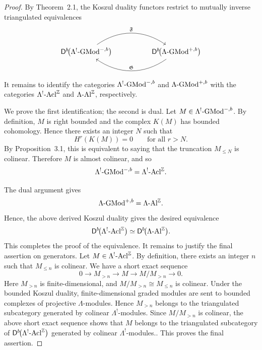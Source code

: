 \documentclass[11pt]{article}
\theoremstyle{definition}
\theoremstyle{remark}
\begin{document}
\begin{proof}
By Theorem~2.1, the Koszul duality functors restrict to mutually inverse
triangulated equivalences
\[
\begin{tikzcd}[column sep=huge]
\mathsf{D}^{b}\!\bigl(\Lambda^{!}\textup{-}\mathrm{GMod}^{-,b}\bigr)
\arrow[r, bend left=35, "\mathfrak{F}"]
&
\mathsf{D}^{b}\!\bigl(\Lambda\textup{-}\mathrm{GMod}^{+,b}\bigr)
\arrow[l, bend left=35, "\mathfrak{G}"']
\end{tikzcd}
\]
It remains to identify the categories
\(\Lambda^{!}\textup{-}\mathrm{GMod}^{-,b}\) and
\(\Lambda\textup{-}\mathrm{GMod}^{+,b}\) with the categories
\(\Lambda^{!}\textup{-Acl}^{\mathbb Z}\) and
\(\Lambda\textup{-Al}^{\mathbb Z}\), respectively.

We prove the first identification; the second is dual. Let
\(M\in\Lambda^{!}\textup{-}\mathrm{GMod}^{-,b}\). By definition,
\(M\) is right bounded and the complex \(K(M)\) has bounded cohomology.
Hence there exists an integer \(N\) such that
\[
H^r(K(M))=0
\qquad
\text{for all } r>N.
\]
By Proposition~3.1, this is equivalent to saying that the truncation
\(M_{\leq N}\) is colinear. Therefore \(M\) is almost colinear, and so
\[
\Lambda^{!}\textup{-}\mathrm{GMod}^{-,b}
=
\Lambda^{!}\textup{-Acl}^{\mathbb Z}.
\]

The dual argument gives
\[
\Lambda\textup{-}\mathrm{GMod}^{+,b}
=
\Lambda\textup{-Al}^{\mathbb Z}.
\]
Hence, the above derived Koszul duality gives
the desired equivalence
\[
\mathsf{D}^{b}\!\bigl(\Lambda^{!}\textup{-Acl}^{\mathbb Z}\bigr)
\simeq
\mathsf{D}^{b}\!\bigl(\Lambda\textup{-Al}^{\mathbb Z}\bigr).
\]
This completes the proof of the equivalence. It remains to justify the final assertion on generators. Let
\(M\in \Lambda^{!}\textup{-}\mathrm{Acl}^{\mathbb{Z}}\). By definition, there
exists an integer \(n\) such that \(M_{\leq n}\) is colinear. We have a short
exact sequence
\[
0
\longrightarrow
M_{>n}
\longrightarrow
M
\longrightarrow
M/M_{>n}
\longrightarrow
0 .
\]
Here \(M_{>n}\) is finite-dimensional, and
\(M/M_{>n}\cong M_{\leq n}\) is colinear. Under the bounded Koszul duality,
finite-dimensional graded modules are sent to bounded complexes of projective
\(\Lambda\)-modules. Hence \(M_{>n}\) belongs to the triangulated subcategory
generated by colinear \(\Lambda^{!}\)-modules. Since \(M/M_{>n}\) is colinear,
the above short exact sequence shows that \(M\) belongs to the triangulated
subcategory of
\(\mathsf{D}^{b}\!\bigl(\Lambda^{!}\textup{-}\mathrm{Acl}^{\mathbb{Z}}\bigr)\)
generated by colinear \(\Lambda^{!}\)-modules.. This
proves the final assertion.
\end{proof}
\end{document}
